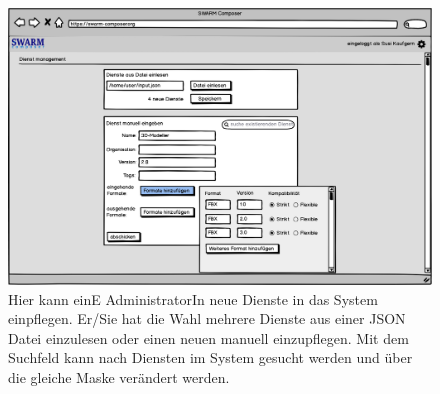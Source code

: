\begin{figure}[h]
	\centering
	\includegraphics[width=\textwidth]{img/admin}
	\caption{
            Hier kann einE AdministratorIn neue Dienste in das System einpflegen.
            Er/Sie hat die Wahl mehrere Dienste aus einer JSON Datei einzulesen
            oder einen neuen manuell einzupflegen. Mit dem Suchfeld kann nach Diensten
            im System gesucht werden und über die gleiche Maske verändert werden.
        }
	\label{fig:admin}
\end{figure}
